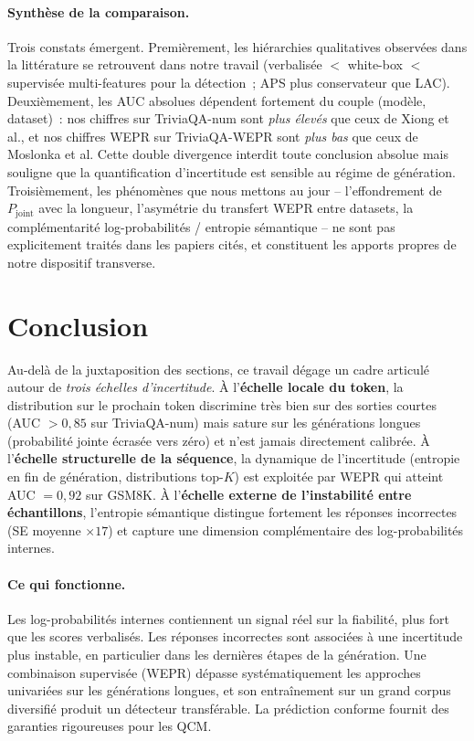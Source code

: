 \documentclass[12pt,a4paper]{article}
\begin{document}
\paragraph{Synthèse de la comparaison.}
Trois constats émergent. Premièrement, les hiérarchies qualitatives observées dans la littérature se retrouvent dans notre travail (verbalisée $<$ white-box $<$ supervisée multi-features pour la détection~; APS plus conservateur que LAC). Deuxièmement, les AUC absolues dépendent fortement du couple (modèle, dataset)~: nos chiffres sur TriviaQA-num sont \emph{plus élevés} que ceux de Xiong et al., et nos chiffres WEPR sur TriviaQA-WEPR sont \emph{plus bas} que ceux de Moslonka et al. Cette double divergence interdit toute conclusion absolue mais souligne que la quantification d'incertitude est sensible au régime de génération. Troisièmement, les phénomènes que nous mettons au jour -- l'effondrement de $P_{\mathrm{joint}}$ avec la longueur, l'asymétrie du transfert WEPR entre datasets, la complémentarité log-probabilités / entropie sémantique -- ne sont pas explicitement traités dans les papiers cités, et constituent les apports propres de notre dispositif transverse.


\section{Conclusion}

Au-delà de la juxtaposition des sections, ce travail dégage un cadre articulé autour de \emph{trois échelles d'incertitude}. À l'\textbf{échelle locale du token}, la distribution sur le prochain token discrimine très bien sur des sorties courtes (AUC $> 0{,}85$ sur TriviaQA-num) mais sature sur les générations longues (probabilité jointe écrasée vers zéro) et n'est jamais directement calibrée. À l'\textbf{échelle structurelle de la séquence}, la dynamique de l'incertitude (entropie en fin de génération, distributions top-$K$) est exploitée par WEPR qui atteint AUC $= 0{,}92$ sur GSM8K. À l'\textbf{échelle externe de l'instabilité entre échantillons}, l'entropie sémantique distingue fortement les réponses incorrectes (SE moyenne $\times 17$) et capture une dimension complémentaire des log-probabilités internes.

\paragraph{Ce qui fonctionne.} Les log-probabilités internes contiennent un signal réel sur la fiabilité, plus fort que les scores verbalisés. Les réponses incorrectes sont associées à une incertitude plus instable, en particulier dans les dernières étapes de la génération. Une combinaison supervisée (WEPR) dépasse systématiquement les approches univariées sur les générations longues, et son entraînement sur un grand corpus diversifié produit un détecteur transférable. La prédiction conforme fournit des garanties rigoureuses pour les QCM.
\end{document}
